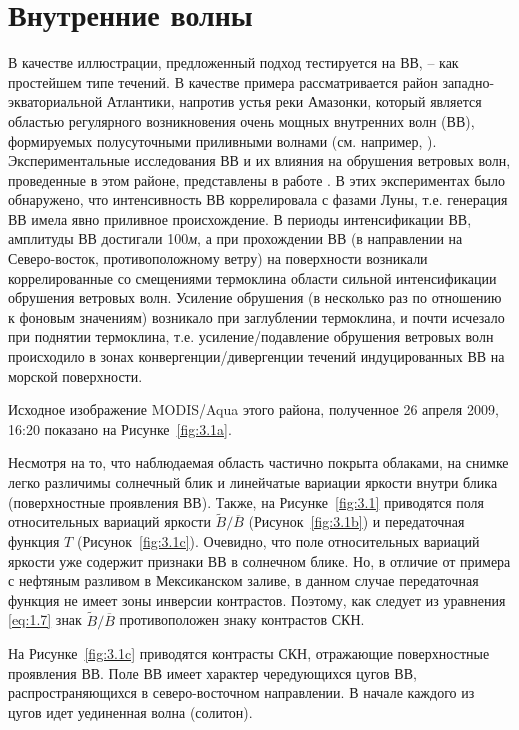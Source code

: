 {\section{Внутренние волны} \label{sec:3.1}


В качестве иллюстрации, предложенный подход тестируется на ВВ, -- как простейшем типе течений. В качестве примера рассматривается район западно-экваториальной Атлантики, напротив устья реки Амазонки, который является областью регулярного возникновения очень мощных внутренних волн (ВВ), формируемых полусуточными приливными волнами (см. например, \citep{Ivanov1993}). Экспериментальные исследования ВВ и их влияния на обрушения ветровых волн, проведенные в этом районе, представлены в работе \citep{1986}. В этих экспериментах было обнаружено, что интенсивность ВВ коррелировала с фазами Луны, т.е. генерация ВВ имела явно приливное происхождение. В периоды интенсификации ВВ, амплитуды ВВ достигали 100\textit{м}, а при прохождении ВВ (в направлении на Северо-восток, противоположному ветру) на поверхности возникали коррелированные со смещениями термоклина области сильной интенсификации обрушения ветровых волн. Усиление обрушения (в несколько раз по отношению к фоновым значениям) возникало при заглублении термоклина, и почти исчезало при поднятии термоклина, т.е. усиление/подавление обрушения ветровых волн происходило в зонах конвергенции/дивергенции течений индуцированных ВВ на морской поверхности. 

Исходное изображение MODIS/Aqua этого района, полученное 26 апреля 2009, 16:20 показано на Рисунке~\ref{fig:3.1a}.

Несмотря на то, что наблюдаемая область частично покрыта облаками, на снимке легко различимы солнечный блик и линейчатые вариации яркости внутри блика (поверхностные проявления ВВ). Также, на Рисунке~\ref{fig:3.1} приводятся поля относительных вариаций яркости $\widetilde{B}/\overline{B}$ (Рисунок~\ref{fig:3.1b}) и передаточная функция $T$ (Рисунок~\ref{fig:3.1c}). Очевидно, что поле относительных вариаций яркости уже содержит признаки ВВ в солнечном блике. Но, в отличие от примера с нефтяным разливом в Мексиканском заливе, в данном случае передаточная функция не имеет зоны инверсии контрастов. Поэтому, как следует из уравнения \eqref{eq:1.7} знак $\widetilde{B}/\overline{B}$ противоположен знаку контрастов СКН.

На Рисунке~\ref{fig:3.1c} приводятся контрасты СКН, отражающие поверхностные проявления ВВ. Поле ВВ имеет характер чередующихся цугов ВВ, распространяющихся в северо-восточном направлении. В начале каждого из цугов идет уединенная волна (солитон).

}
